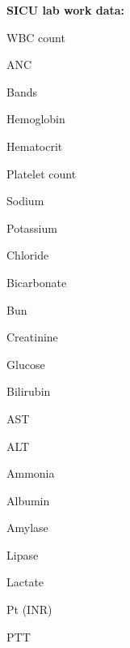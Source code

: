 \documentclass{sig-alternate}
\begin{document}
\noindent \textbf{SICU lab work data:}
\begin{itemize*}
  \item WBC count \vspace{3pt}
  \item ANC \vspace{3pt}
  \item Bands \vspace{3pt}
  \item Hemoglobin \vspace{3pt}
  \item Hematocrit \vspace{3pt}
  \item Platelet count \vspace{3pt}
  \item Sodium \vspace{3pt}
  \item Potassium \vspace{3pt}
  \item Chloride \vspace{3pt}
  \item Bicarbonate \vspace{3pt}
  \item Bun \vspace{3pt}
  \item Creatinine \vspace{3pt}
  \item Glucose \vspace{3pt}
  \item Bilirubin \vspace{3pt}
  \item AST \vspace{3pt}
  \item ALT \vspace{3pt}
  \item Ammonia \vspace{3pt}
  \item Albumin \vspace{3pt}
  \item Amylase \vspace{3pt}
  \item Lipase \vspace{3pt}
  \item Lactate \vspace{3pt}
  \item Pt (INR)  \vspace{3pt}
  \item PTT \vspace{3pt}

\end{itemize*}
\end{document}
